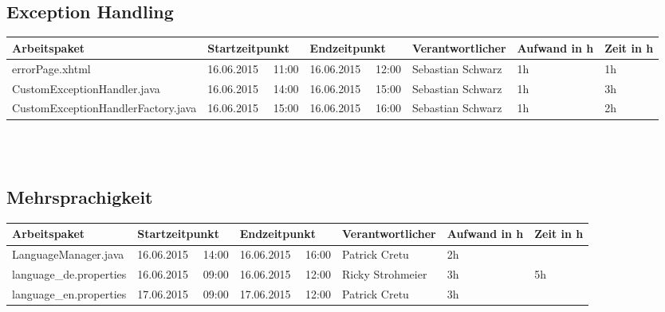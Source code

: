 \begin{landscape}
\begin{tabular}{|p{10.3cm}|p{3.2cm}|p{3.2cm}|p{3.5cm}|p{1.7cm}|p{1.5cm}|}
	
	\end{tabular} \ \\
	\ \\
	
	\subsection{Exception Handling}
	\begin{tabular}{|p{10.3cm}|p{3.2cm}|p{3.2cm}|p{3.5cm}|p{1.7cm}|p{1.5cm}|}
		\hline  \textbf{Arbeitspaket} & \textbf{Startzeitpunkt} & \textbf{Endzeitpunkt} & \textbf{Verantwortlicher}  & \textbf{Aufwand in h} & \textbf{Zeit in h}\\ 
		\hline   errorPage.xhtml                                        & 16.06.2015 \ \ 11:00       & 16.06.2015 \ \ 12:00        & Sebastian Schwarz & 1h                 & 1h\\  
		\hline   CustomExceptionHandler.java                            & 16.06.2015 \ \ 14:00       & 16.06.2015 \ \ 15:00       & Sebastian Schwarz & 1h                 & 3h\\  
		\hline   CustomExceptionHandlerFactory.java                     & 16.06.2015 \ \ 15:00       & 16.06.2015 \ \ 16:00       & Sebastian Schwarz  & 1h                 & 2h\\  
		\hline 
	\end{tabular} \ \\
	\ \\	
	
	\subsection{Mehrsprachigkeit}
	\begin{tabular}{|p{10.3cm}|p{3.2cm}|p{3.2cm}|p{3.5cm}|p{1.7cm}|p{1.5cm}|}
		\hline  \textbf{Arbeitspaket} & \textbf{Startzeitpunkt} & \textbf{Endzeitpunkt} & \textbf{Verantwortlicher}  & \textbf{Aufwand in h} & \textbf{Zeit in h}\\ 
		\hline   LanguageManager.java                                  & 16.06.2015 \ \ 14:00        & 16.06.2015 \ \ 16:00       & Patrick Cretu  &  2h                 & \\ 
		\hline   language\_de.properties                               & 16.06.2015 \ \ 09:00        & 16.06.2015 \ \ 12:00       & Ricky Strohmeier &  3h    & 5h \\
		\hline   language\_en.properties                               & 17.06.2015 \ \ 09:00        & 17.06.2015 \ \ 12:00       & Patrick Cretu  &  3h                 & \\ 
		\hline 
	\end{tabular} \ \\
	\ \\
	

\end{landscape}
